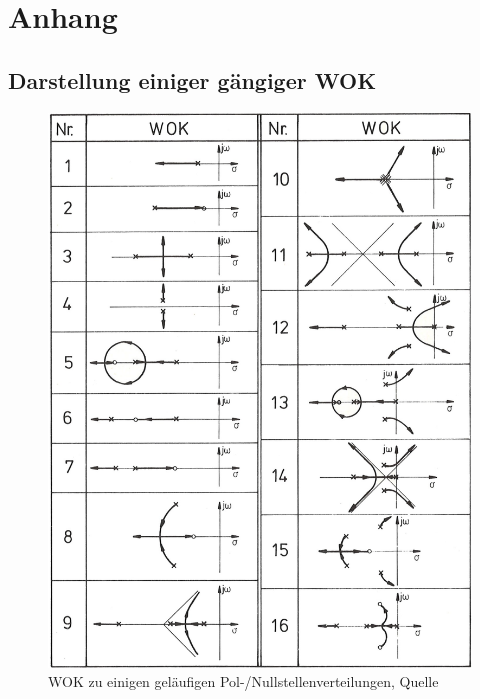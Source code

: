
\section{Anhang}
  \subsection{Darstellung einiger gängiger WOK}
    \begin{figure}[h!]
      \begin{center}
		    \includegraphics[width=14cm]{./images/BilderWOK.png}
		    \caption{WOK zu einigen geläufigen Pol-/Nullstellenverteilungen, Quelle}
      \end{center}
	  \end{figure}
     \clearpage
 

